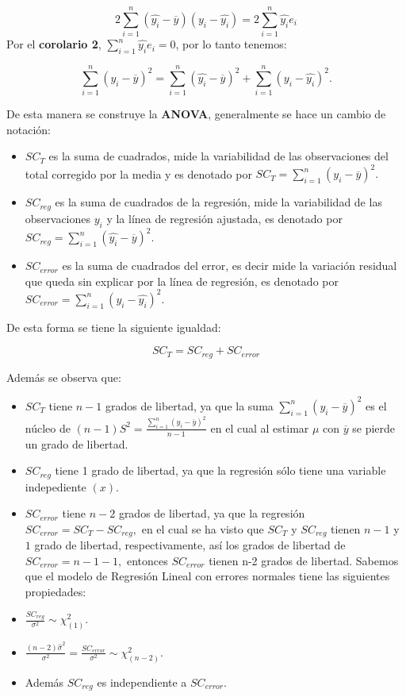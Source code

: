 \documentclass[
  a4paper,
  oneside,
  openany]{book}
\begin{document}
\[2\sum_{i=1}^{n}(\hat{y_{i}}-\overline{y})(y_{i}-\hat{y_{i}})=2\sum_{i=1}^{n}\hat{y_{i}}e_{i}\]
Por el \textbf{corolario 2}, \(\sum_{i=1}^{n}\hat{y_{i}}e_{i}=0\), por lo tanto tenemos:

\[\sum_{i=1}^{n}(y_{i}-\overline{y})^2=\sum_{i=1}^{n}(\hat{y_{i}}-\overline{y})^2+\sum_{i=1}^{n}(y_{i}-\hat{y_{i}})^2.\]

De esta manera se construye la \textbf{ANOVA}, generalmente se hace un cambio de notación:

\begin{itemize}
\item
  \(SC_{T}\) es la suma de cuadrados, mide la variabilidad de las observaciones del total corregido por la media y es denotado por \(SC_{T}=\sum_{i=1}^{n}(y_{i}-\overline{y})^2.\)
\item
  \(SC_{reg}\) es la suma de cuadrados de la regresión, mide la variabilidad de las observaciones \(y_{i}\) y la línea de regresión ajustada, es denotado por \(SC_{reg}=\sum_{i=1}^{n}(\hat{y_{i}}-\overline{y})^2.\)
\item
  \(SC_{error}\) es la suma de cuadrados del error, es decir mide la variación residual que queda sin explicar por la línea de regresión, es denotado por \(SC_{error}=\sum_{i=1}^{n}(y_{i}-\hat{y_{i}})^2.\)
\end{itemize}

De esta forma se tiene la siguiente igualdad:

\[SC_{T}=SC_{reg}+SC_{error}\]

Además se observa que:

\begin{itemize}
\item
  \(SC_{T}\) tiene \(n-1\) grados de libertad, ya que la suma \(\sum_{i=1}^{n}(y_{i}-\overline{y})^2\) es el núcleo de \((n-1)S^2=\frac{\sum_{i=1}^{n}(y_{i}-\overline{y})^2}{n-1}\) en el cual al estimar \(\mu\) con \(\overline{y}\) se pierde un grado de libertad.
\item
  \(SC_{reg}\) tiene 1 grado de libertad, ya que la regresión sólo tiene una variable indepediente \((x).\)
\item
  \(SC_{error}\) tiene \(n-2\) grados de libertad, ya que la regresión \(SC_{error}=SC_{T}-SC_{reg},\) en el cual se ha visto que \(SC_{T}\) y \(SC_{reg}\) tienen \(n-1\) y \(1\) grado de libertad, respectivamente, así los grados de libertad de \(SC_{error}=n-1-1,\) entonces \(SC_{error}\) tienen n-2 grados de libertad.
  Sabemos que el modelo de Regresión Lineal con errores normales tiene las siguientes propiedades:
\item
  \(\frac{SC_{reg}}{\sigma^2}\sim \chi^2_{(1)}.\)
\item
  \(\frac{(n-2)\hat{\sigma}^2}{\sigma^2}=\frac{SC_{error}}{\sigma^2}\sim\chi^2_{(n-2)}.\)
\item
  Además \(SC_{reg}\) es independiente a \(SC_{error}.\)
\end{itemize}
\end{document}

